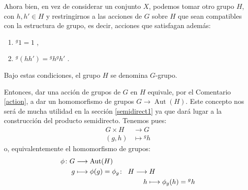 




Ahora bien, en vez de considerar un conjunto $X$, podemos tomar otro grupo $H$, con $h,h'\in H$ y restringirnos a las acciones de $G$ sobre $H$ que sean compatibles con la estructura de grupo, es decir, acciones que satisfagan además:
\begin{enumerate}
    \item ${}^g1=1$ , \label{grupo1}
    \item ${}^g(hh') = {}^gh {}^gh'$ .\label{grupo2}
\end{enumerate}

Bajo estas condiciones, el grupo $H$ se denomina $G$-grupo.

Entonces, dar una acción de grupos de $G$ en $H$ equivale, por el Comentario \ref{action}, a dar un homomorfismo de grupos $G \rightarrow \operatorname{Aut}(H)$. Este concepto nos será de mucha utilidad en la sección \ref{semidirect1} ya que dará lugar a la construcción del producto semidirecto. Tenemos pues:
\begin{align*}
    G \times H &\rightarrow G \\
    (g,h) & \mapsto {}^gh
\end{align*}
o, equivalentemente el homomorfismo de grupos:
\begin{align*}
    \phi \colon G &\longrightarrow \operatorname{Aut}(H) \\
    g  &\longmapsto \phi(g) = \phi_g   \colon \; \; H\longrightarrow H \\
        & \hspace{3.5cm}   h \longmapsto \phi_g(h) = {}^gh
\end{align*}








